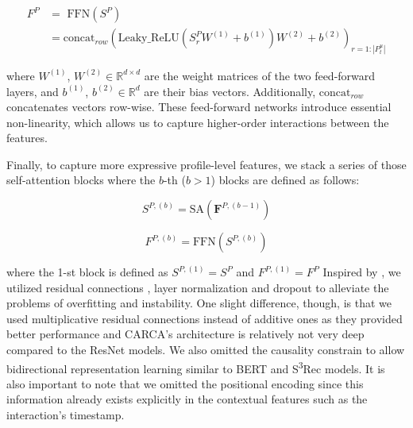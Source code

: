 \documentclass[sigconf,natbib=true]{acmart}
\begin{document}
\begin{equation} 
\begin{split}
F^{P} &= \textrm{ FFN}(S^{P}) \\& = \text{concat}_{row} \left( \textrm{Leaky\_ReLU} (S^{P}_r W^{(1)} + b^{(1)})W^{(2)} + b^{(2)}  \right)_{r=1:|P^{u}_{t}|}
\end{split}
\end{equation} 


\noindent where $W^{(1)}$, $W^{(2)} \in \mathbb{R}^{d \times d}$ are the weight matrices of the two feed-forward layers, and $b^{(1)}$, $b^{(2)} \in \mathbb{R}^{d}$ are their bias vectors. Additionally, $\text{concat}_{row}$ concatenates vectors row-wise. These feed-forward networks introduce essential non-linearity, which allows us to capture higher-order interactions between the features.

Finally, to capture more expressive profile-level features, we stack a series of those self-attention blocks where the $b$-th ($b > 1$) blocks are defined as follows:

\begin{equation} 
S^{P,(b)} = \textrm{SA}(\textbf{F}^{P,(b-1)}) 
\end{equation} 

\begin{equation} 
F^{P,(b)} = \textrm{FFN}(S^{P,(b)}) 
\end{equation} 

\noindent where the 1-st block is defined as $S^{P,(1)} = S^{P}$ and $F^{P,(1)} = F^{P}$ 
Inspired by \cite{vaswani2017attention,kang2018self}, we utilized residual connections \cite{he2016deep}, layer normalization \cite{ba2016layer} and dropout \cite{srivastava2014dropout} to alleviate the problems of overfitting and instability. One slight difference, though, is that we used multiplicative residual connections instead of additive ones as they provided better performance and CARCA's architecture is relatively not very deep compared to the ResNet models. We also omitted the causality constrain to allow bidirectional representation learning similar to BERT\cite{devlin2019bert} and S\textsuperscript{3}Rec \cite{ZhouWZZWZWW20} models. It is also important to note that we omitted the positional encoding since this information already exists explicitly in the contextual features such as the interaction's timestamp.
\end{document}

